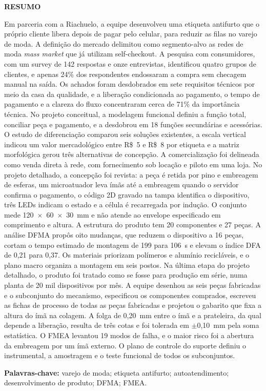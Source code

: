 \begin{center}
    \textbf{RESUMO}
\end{center}

\noindent Em parceria com a Riachuelo, a equipe desenvolveu uma etiqueta antifurto que o próprio cliente libera depois de pagar pelo celular, para reduzir as filas no varejo de moda. A definição do mercado delimitou como segmento-alvo as redes de moda \textit{mass market} que já utilizam self-checkout. A pesquisa com consumidores, com um survey de 142 respostas e onze entrevistas, identificou quatro grupos de clientes, e apenas 24\% dos respondentes endossaram a compra sem checagem manual na saída. Os achados foram desdobrados em sete requisitos técnicos por meio da casa da qualidade, e a liberação condicionada ao pagamento, o tempo de pagamento e a clareza do fluxo concentraram cerca de 71\% da importância técnica. No projeto conceitual, a modelagem funcional definiu a função total, conciliar peça e pagamento, e a desdobrou em 18 funções secundárias e acessórias. O estudo de diferenciação comparou seis soluções existentes, a escala vertical indicou um valor mercadológico entre R\$~5 e R\$~8 por etiqueta e a matriz morfológica gerou três alternativas de concepção. A comercialização foi delineada como venda direta à rede, com fornecimento sob locação e piloto em uma loja. No projeto detalhado, a concepção foi revista: a peça é retida por pino e embreagem de esferas, um microatuador leva ímãs até a embreagem quando o servidor confirma o pagamento, o código 2D gravado na tampa identifica o dispositivo, três LEDs indicam o estado e a célula é recarregada por indução. O conjunto mede 120~$\times$~60~$\times$~30~mm e não atende ao envelope especificado em comprimento e altura. A estrutura do produto tem 20 componentes e 27 peças. A análise DFMA propôs oito mudanças, que reduzem o dispositivo a 16 peças, cortam o tempo estimado de montagem de 199 para 106~s e elevam o índice DFA de 0,21 para 0,37. Os materiais priorizam polímeros e alumínio recicláveis, e o plano macro organiza a montagem em seis postos. Na última etapa do projeto detalhado, o produto foi tratado como se fosse para produção em série, numa planta de 20 mil dispositivos por mês. A equipe desenhou as seis peças fabricadas e o subconjunto do mecanismo, especificou os componentes comprados, escreveu as fichas de processo de todas as peças fabricadas e projetou o gabarito que fixa a altura do ímã na colagem. A folga de 0,20~mm entre o ímã e a prateleira, da qual depende a liberação, resulta de três cotas e foi tolerada em $\pm$0,10~mm pela soma estatística. O FMEA levantou 19 modos de falha, e o maior risco foi a abertura da embreagem por um ímã externo. O plano de controle do suporte definiu o instrumental, a amostragem e o teste funcional de todos os subconjuntos.

\vspace{1em}
\noindent\textbf{Palavras-chave:} varejo de moda; etiqueta antifurto; autoatendimento; desenvolvimento de produto; DFMA; FMEA.
